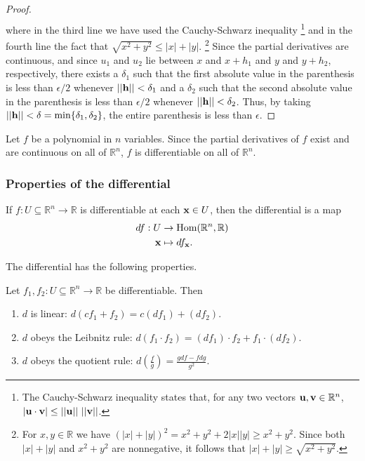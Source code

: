 \documentclass[12pt,letterpaper,reqno]{article}
\numberwithin{equation}{section}
\newcommand{\R}{\ensuremath{\mathbb R}}
\newcommand{\bu}{{\bf u}}
\newcommand{\bv}{{\bf v}}
\newcommand{\bx}{{\bf x}}
\begin{document}
{\begin{proof}
\begin{align*}
\end{align*}
where in the third line we have used the Cauchy-Schwarz inequality \footnote{The Cauchy-Schwarz inequality states that, for any two vectors $\bu, \bv \in \R^n$, $|\bu \cdot \bv| \leq ||\bu|| \ ||\bv||$.} and in the fourth line the fact that $\sqrt{x^2+y^2}\leq |x|+|y|$. \footnote{For $x,y \in \R$ we have $(|x|+|y|)^2=x^2+y^2+2|x||y| \geq x^2+y^2$. Since both $|x|+|y|$ and $x^2+y^2$ are nonnegative, it follows that $|x|+|y| \geq \sqrt{x^2+y^2}$.} Since the partial derivatives are continuous, and since $u_1$ and $u_2$ lie between $x$ and $x+h_1$ and $y$ and $y+h_2$, respectively, there exists a $\delta_1$ such that the first absolute value in the parenthesis is less than $\epsilon/2$ whenever $||{\bf h}||<\delta_1$ and a $\delta_2$ such that the second absolute value in the parenthesis is less than $\epsilon/2$ whenever $||{\bf h}||<\delta_2$. Thus, by taking $||{\bf h}||<\delta=\text{min}\{\delta_1,\delta_2\}$, the entire parenthesis is less than $\epsilon$.
\end{proof}

\begin{example}
Let $f$ be a polynomial in $n$ variables. Since the partial derivatives of $f$ exist and are continuous on all of $\R^n$, $f$ is differentiable on all of $\R^n$.	
\end{example}


\subsubsection{Properties of the differential}
If $f:U \subseteq \R^n \to \R$ is differentiable at each $\bx \in U$, then the differential is a map
\begin{align*}
	df:U &\to \text{Hom}(\R^n,\R) \\
	\bx &\mapsto df_\bx.
\end{align*}

The differential has the following properties.

\begin{thm}\label{thm:algebraic_properties_of_the_differential}
Let $f_1,f_2:U \subseteq \R^n \to \R$ be differentiable. Then
\begin{enumerate}[(1)]
	\item $d$ is linear: $d(cf_1+f_2)=c(df_1)+(df_2)$.
	\item $d$ obeys the Leibnitz rule: $d(f_1 \cdot f_2)=(df_1) \cdot f_2+f_1 \cdot (df_2)$.
	\item $d$ obeys the quotient rule: $d(\frac{f}{g})=\frac{g df-fdg}{g^2}$.
\end{enumerate}	
\end{thm}

}
\end{document}
